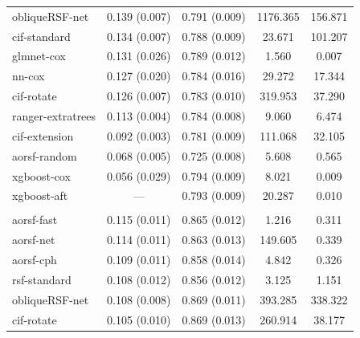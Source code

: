 \documentclass{article}\usepackage[]{graphicx}\usepackage[]{xcolor}
\newenvironment{knitrout}{}{} %
\begin{document}
\begin{knitrout}
\begin{longtable}[t]{lcccc}
\hspace{1em}obliqueRSF-net & 0.139 (0.007) & 0.791 (0.009) & 1176.365 & 156.871\\
\hspace{1em}cif-standard & 0.134 (0.007) & 0.788 (0.009) & 23.671 & 101.207\\
\hspace{1em}glmnet-cox & 0.131 (0.026) & 0.789 (0.012) & 1.560 & 0.007\\
\hspace{1em}nn-cox & 0.127 (0.020) & 0.784 (0.016) & 29.272 & 17.344\\
\hspace{1em}cif-rotate & 0.126 (0.007) & 0.783 (0.010) & 319.953 & 37.290\\
\hspace{1em}ranger-extratrees & 0.113 (0.004) & 0.784 (0.008) & 9.060 & 6.474\\
\hspace{1em}cif-extension & 0.092 (0.003) & 0.781 (0.009) & 111.068 & 32.105\\
\hspace{1em}aorsf-random & 0.068 (0.005) & 0.725 (0.008) & 5.608 & 0.565\\
\hspace{1em}xgboost-cox & 0.056 (0.029) & 0.794 (0.009) & 8.021 & 0.009\\
\hspace{1em}xgboost-aft & --- & 0.793 (0.009) & 20.287 & 0.010\\
\addlinespace[0.3em]
\multicolumn{5}{l}{\textit{\textbf{MESA; heart failure, n = 6785, p = 48}}}\\
\hline
\hspace{1em}aorsf-fast & 0.115 (0.011) & 0.865 (0.012) & 1.216 & 0.311\\
\hspace{1em}aorsf-net & 0.114 (0.011) & 0.863 (0.013) & 149.605 & 0.339\\
\hspace{1em}aorsf-cph & 0.109 (0.011) & 0.858 (0.014) & 4.842 & 0.326\\
\hspace{1em}rsf-standard & 0.108 (0.012) & 0.856 (0.012) & 3.125 & 1.151\\
\hspace{1em}obliqueRSF-net & 0.108 (0.008) & 0.869 (0.011) & 393.285 & 338.322\\
\hspace{1em}cif-rotate & 0.105 (0.010) & 0.869 (0.013) & 260.914 & 38.177\\

\end{longtable}
\end{knitrout}
\end{document}
